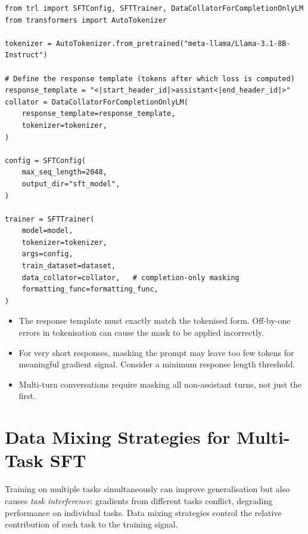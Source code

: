 \begin{examplebox}
\begin{lstlisting}[style=pythonstyle]
from trl import SFTConfig, SFTTrainer, DataCollatorForCompletionOnlyLM
from transformers import AutoTokenizer

tokenizer = AutoTokenizer.from_pretrained("meta-llama/Llama-3.1-8B-Instruct")

# Define the response template (tokens after which loss is computed)
response_template = "<|start_header_id|>assistant<|end_header_id|>"
collator = DataCollatorForCompletionOnlyLM(
    response_template=response_template,
    tokenizer=tokenizer,
)

config = SFTConfig(
    max_seq_length=2048,
    output_dir="sft_model",
)

trainer = SFTTrainer(
    model=model,
    tokenizer=tokenizer,
    args=config,
    train_dataset=dataset,
    data_collator=collator,   # completion-only masking
    formatting_func=formatting_func,
)
\end{lstlisting}
\end{examplebox}

\begin{warningbox}
\begin{itemize}
  \item The response template must exactly match the tokenised form. Off-by-one errors in tokenisation can cause the mask to be applied incorrectly.
  \item For very short responses, masking the prompt may leave too few tokens for meaningful gradient signal. Consider a minimum response length threshold.
  \item Multi-turn conversations require masking all non-assistant turns, not just the first.
\end{itemize}
\end{warningbox}

\section{Data Mixing Strategies for Multi-Task SFT}
\label{sec:data-mixing}

\begin{intuitionbox}
Training on multiple tasks simultaneously can improve generalisation but also causes \emph{task interference}: gradients from different tasks conflict, degrading performance on individual tasks. Data mixing strategies control the relative contribution of each task to the training signal.
\end{intuitionbox}


